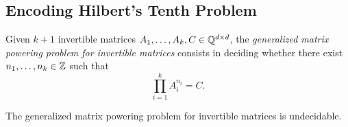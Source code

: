 \subsection{Encoding Hilbert's Tenth Problem}
\label{sec:matrix-undecidability}

Given $k+1$ invertible matrices $A_{1}, \ldots, A_{k},C \in \mathbb{Q}^{d \times d}$, the \emph{generalized matrix powering problem for invertible matrices} consists in deciding whether there exist $n_{1}, \ldots, n_{k} \in \mathbb{Z}$ such that
\begin{equation*}
\prod\limits_{i=1}^{k} A_{i}^{n_{i}} = C.
\end{equation*}

\begin{theorem}
The generalized matrix powering problem for invertible matrices is undecidable.
\end{theorem}

